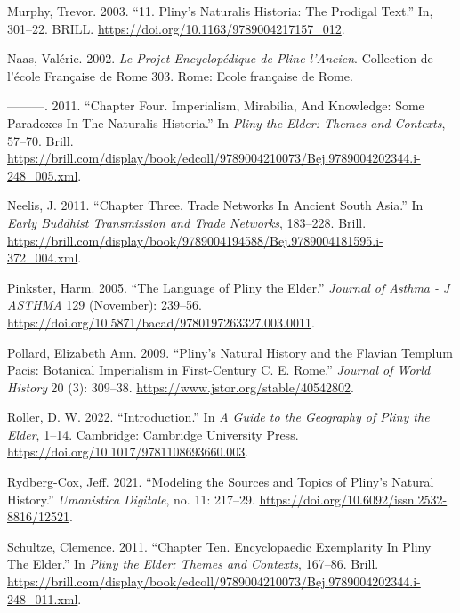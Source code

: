\documentclass[
  12pt,
]{article}
\newlength{\cslhangindent}
\newlength{\cslentryspacingunit} %
\newenvironment{CSLReferences}[2] %
 {%
  \setlength{\parindent}{0pt}
  \ifodd #1
  \let\oldpar\par
  \def\par{\hangindent=\cslhangindent\oldpar}
  \fi
  \setlength{\parskip}{#2\cslentryspacingunit}
 }%
 {}
\begin{document}
\begin{CSLReferences}{1}{0}
\leavevmode{}%
Murphy, Trevor. 2003. {``11. Pliny{'}s Naturalis Historia: The Prodigal
Text.''} In, 301--22. BRILL.
\url{https://doi.org/10.1163/9789004217157_012}.

\leavevmode{}%
Naas, Valérie. 2002. \emph{Le Projet Encyclopédique de {Pline}
l'{Ancien}}. Collection de l'école Française de {Rome} 303. Rome: Ecole
française de Rome.

\leavevmode{}%
---------. 2011. {``Chapter {Four}. {Imperialism}, {Mirabilia}, {And}
{Knowledge}: {Some} {Paradoxes} {In} {The} {Naturalis} {Historia}.''} In
\emph{Pliny the {Elder}: {Themes} and {Contexts}}, 57--70. Brill.
\url{https://brill.com/display/book/edcoll/9789004210073/Bej.9789004202344.i-248_005.xml}.

\leavevmode{}%
Neelis, J. 2011. {``Chapter {Three}. {Trade} {Networks} {In} {Ancient}
{South} {Asia}.''} In \emph{Early {Buddhist} {Transmission} and {Trade}
{Networks}}, 183--228. Brill.
\url{https://brill.com/display/book/9789004194588/Bej.9789004181595.i-372_004.xml}.

\leavevmode{}%
Pinkster, Harm. 2005. {``The {Language} of {Pliny} the {Elder}.''}
\emph{Journal of Asthma - J ASTHMA} 129 (November): 239--56.
\url{https://doi.org/10.5871/bacad/9780197263327.003.0011}.

\leavevmode{}%
Pollard, Elizabeth Ann. 2009. {``Pliny's {Natural} {History} and the
{Flavian} {Templum} {Pacis}: {Botanical} {Imperialism} in
{First}-{Century} {C}. {E}. {Rome}.''} \emph{Journal of World History}
20 (3): 309--38. \url{https://www.jstor.org/stable/40542802}.

\leavevmode{}%
Roller, D. W. 2022. {``Introduction.''} In \emph{A {Guide} to the
{Geography} of {Pliny} the {Elder}}, 1--14. Cambridge: Cambridge
University Press. \url{https://doi.org/10.1017/9781108693660.003}.

\leavevmode{}%
Rydberg-Cox, Jeff. 2021. {``Modeling the {Sources} and {Topics} of
{Pliny}'s {Natural} {History}.''} \emph{Umanistica Digitale}, no. 11:
217--29. \url{https://doi.org/10.6092/issn.2532-8816/12521}.

\leavevmode{}%
Schultze, Clemence. 2011. {``Chapter {Ten}. {Encyclopaedic}
{Exemplarity} {In} {Pliny} {The} {Elder}.''} In \emph{Pliny the {Elder}:
{Themes} and {Contexts}}, 167--86. Brill.
\url{https://brill.com/display/book/edcoll/9789004210073/Bej.9789004202344.i-248_011.xml}.


\end{CSLReferences}
\end{document}
